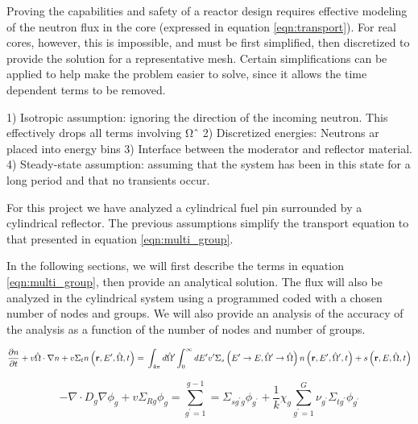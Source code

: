 \documentclass[../main.tex]{subfiles}
\begin{document}
Proving the capabilities and safety of a reactor design requires effective modeling of the neutron flux in the core (expressed in equation \ref{eqn:transport}). For real cores, however, this is impossible, and must be first simplified, then discretized to provide the solution for a representative mesh. Certain simplifications can be applied to help make the problem easier to solve, since it allows the time dependent terms to be removed.

1) Isotropic assumption: ignoring the direction of the incoming neutron. This effectively drops all terms involving Ωˆ
2) Discretized energies:  Neutrons ar placed into energy bins
3) Interface between the moderator and reflector material.
4) Steady-state assumption: assuming that the system has been in this state for a long period and that no transients occur.



	For this project we have analyzed a cylindrical fuel pin surrounded by a cylindrical reflector.  The previous assumptions simplify the transport equation to that presented in equation \ref{eqn:multi_group}.

	In the following sections, we will first describe the terms in equation \ref{eqn:multi_group}, then provide an analytical solution. The flux will also be analyzed in the cylindrical system using a programmed coded with a chosen number of nodes and groups. We will also provide an analysis of the accuracy of the analysis as a function of the number of nodes and number of groups. 

	
	\begin{equation}
		\pdv{n}{t} + v \hat{\Omega} \cdot \nabla n + v \Sigma_t n \left( \mathbf{r}, E^\prime, \hat{\Omega}, t \right) = \\ \int_{4\pi} d \hat{\Omega} ^\prime \int_0^{\infty} dE ^\prime v^\prime \Sigma_s\left( E ^\prime \rightarrow E, \hat{\Omega} ^\prime \rightarrow \hat{\Omega} \right) n\left( \mathbf{r}, E ^\prime, \hat{\Omega} ^\prime, t \right) + s\left( \mathbf{r}, E, \hat{\Omega}, t \right)
		\label{eqn:transport}
	\end{equation}
	
	\begin{equation}
		- \nabla \cdot D_{g} \nabla \phi_{g}+ v \Sigma_{Rg} \phi_g = \sum_{g^'=1}^{g-1} = \Sigma_{sg^'g} \phi_{g^'} + \frac{1}{k} \chi_g \sum_{g^'=1}^{G} \nu_{g^'} \Sigma_{tg^'} \phi_{g^'} 
		\label{eqn:multi_group}
	\end{equation}
  
\end{document}
